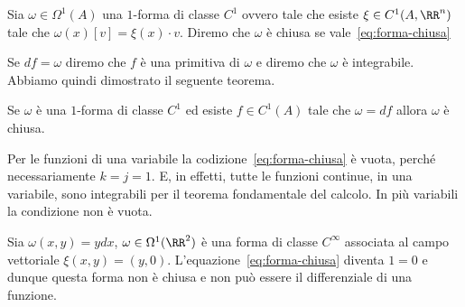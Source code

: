 \begin{definition}
Sia $\omega\in \Omega^1(A)$ una $1$-forma di classe $C^1$
ovvero tale che esiste $\xi\in C^1(A,\RR^n)$ tale che 
$\omega(x)[v] = \xi(x)\cdot v$. 
Diremo che $\omega$ è chiusa se vale~\eqref{eq:forma-chiusa}
\end{definition}

Se $df = \omega$ diremo che $f$ è una primitiva di $\omega$ 
e diremo che $\omega$ è integrabile. 
Abbiamo quindi dimostrato il seguente teorema.

\begin{theorem}
\label{th:forma-chiusa}
Se $\omega$ è una $1$-forma di classe $C^1$ ed esiste 
$f\in C^1(A)$ tale che $\omega = df$ allora $\omega$ è chiusa. 
\end{theorem}

Per le funzioni di una variabile la codizione~\eqref{eq:forma-chiusa} è vuota, 
perché necessariamente $k=j=1$. 
E, in effetti, tutte le funzioni continue, in una variabile, sono integrabili 
per il teorema fondamentale del calcolo. 
In più variabili la condizione non è vuota. 

\begin{example}
Sia $\omega(x,y) = y dx$, $\omega \in \Omega^1(\RR^2)$ è una forma di classe $C^\infty$ 
associata al campo vettoriale $\xi(x,y) = (y,0)$.
L'equazione~\eqref{eq:forma-chiusa} diventa $1=0$ e dunque questa forma non è chiusa e non 
può essere il differenziale di una funzione.
\end{example}

